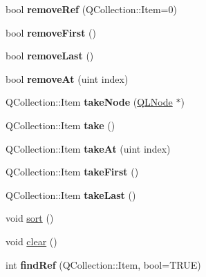 \begin{DoxyCompactItemize}
\item 
\hypertarget{class_q_g_list_ad194cd16951d6be30fbf3691657767f0}{bool {\bfseries remove\-Ref} (Q\-Collection\-::\-Item=0)}\label{class_q_g_list_ad194cd16951d6be30fbf3691657767f0}

\item 
\hypertarget{class_q_g_list_a291e68c36bd5cb789a6b8ced5cfb269d}{bool {\bfseries remove\-First} ()}\label{class_q_g_list_a291e68c36bd5cb789a6b8ced5cfb269d}

\item 
\hypertarget{class_q_g_list_ae83ce1da44a88a7b0ffc68c82bcede5f}{bool {\bfseries remove\-Last} ()}\label{class_q_g_list_ae83ce1da44a88a7b0ffc68c82bcede5f}

\item 
\hypertarget{class_q_g_list_a77754d81e85aa99a7953774d13b35e1d}{bool {\bfseries remove\-At} (uint index)}\label{class_q_g_list_a77754d81e85aa99a7953774d13b35e1d}

\item 
\hypertarget{class_q_g_list_a99a514de06b691d846be92100184580b}{Q\-Collection\-::\-Item {\bfseries take\-Node} (\hyperlink{class_q_l_node}{Q\-L\-Node} $\ast$)}\label{class_q_g_list_a99a514de06b691d846be92100184580b}

\item 
\hypertarget{class_q_g_list_acd5ca1e12680cd48f09765c634e7c457}{Q\-Collection\-::\-Item {\bfseries take} ()}\label{class_q_g_list_acd5ca1e12680cd48f09765c634e7c457}

\item 
\hypertarget{class_q_g_list_a2ddff6a9a593ad3ca0d884eba8c997b9}{Q\-Collection\-::\-Item {\bfseries take\-At} (uint index)}\label{class_q_g_list_a2ddff6a9a593ad3ca0d884eba8c997b9}

\item 
\hypertarget{class_q_g_list_a48032746fddbfa4cc3b7e4ec9c2421f9}{Q\-Collection\-::\-Item {\bfseries take\-First} ()}\label{class_q_g_list_a48032746fddbfa4cc3b7e4ec9c2421f9}

\item 
\hypertarget{class_q_g_list_a94d4358bfa55746db7cf8f4be871173d}{Q\-Collection\-::\-Item {\bfseries take\-Last} ()}\label{class_q_g_list_a94d4358bfa55746db7cf8f4be871173d}

\item 
void \hyperlink{class_q_g_list_a47fdc9eea42b6975cdc835bb2e08810e}{sort} ()
\item 
void \hyperlink{class_q_g_list_ac8bb3912a3ce86b15842e79d0b421204}{clear} ()
\item 
\hypertarget{class_q_g_list_ad71ba25049dfb9ba449913024264d963}{int {\bfseries find\-Ref} (Q\-Collection\-::\-Item, bool=T\-R\-U\-E)}\label{class_q_g_list_ad71ba25049dfb9ba449913024264d963}


\end{DoxyCompactItemize}
